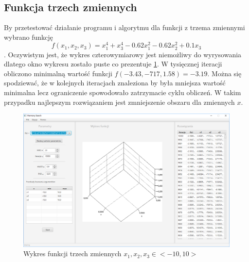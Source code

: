 \documentclass[10pt, a4paper]{article}
\begin{document}
\subsection{Funkcja trzech zmiennych}
\label{subsec:trzyzmienne}
By przetestować działanie programu i algorytmu dla funkcji z trzema zmiennymi wybrano funkcję $$f(x_{1},x_{2},x_{3}) = x_{1}^{4}+x_{3}^{4}-0.62x_{1}^{2}-0.62x_{2}^{2}+0.1x_{3}$$. Oczywistym jest, że wykres czterowymiarowy jest niemożliwy do wyrysowania dlatego okno wykresu zostało puste co prezentuje \ref{fig:41}. W tysięcznej iteracji obliczono minimalną wartość funkcji $f(-3.43,-717,1.58)=-3.19$. Można się spodziewać, że w kolejnych iteracjach znaleziona by była mniejsza wartość minimalna lecz ograniczenie spowodowało zatrzymacie cyklu obliczeń. W takim przypadku najlepszym rozwiązaniem jest zmniejszenie obszaru dla zmiennych $x$.
\begin{figure}[htbp]
	\centering
	\includegraphics[width=.5\textwidth]{images/41.PNG}
	\caption{Wykres funkcji trzech zmiennych $x_{1}, x_{2}, x_{3} \in <-10,10>$}
	\label{fig:41}
\end{figure}
\end{document}
